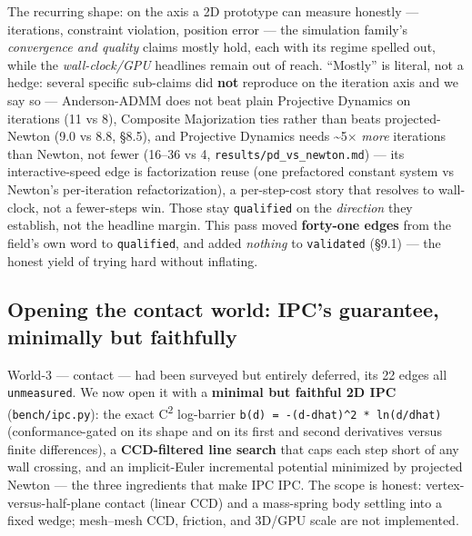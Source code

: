 \documentclass{egpubl}
\begin{document}
The recurring shape: on the axis a 2D prototype can measure honestly --- iterations, constraint
violation, position error --- the simulation family's \emph{convergence and quality} claims mostly hold, each
with its regime spelled out, while the \emph{wall-clock/GPU} headlines remain out of reach. ``Mostly'' is
literal, not a hedge: several specific sub-claims did \textbf{not} reproduce on the iteration axis and we
say so --- Anderson-ADMM does not beat plain Projective Dynamics on iterations (11 vs 8), Composite
Majorization ties rather than beats projected-Newton (9.0 vs 8.8, \S8.5), and Projective Dynamics needs
\textasciitilde{}5$\times$ \emph{more} iterations than Newton, not fewer (16--36 vs 4, \texttt{results/pd\_vs\_newton.md}) --- its
interactive-speed edge is factorization reuse (one prefactored constant system vs Newton's
per-iteration refactorization), a per-step-cost story that resolves to wall-clock, not a fewer-steps win. Those stay \texttt{qualified} on the
\emph{direction} they establish, not the headline margin. This pass moved
\textbf{forty-one edges} from the field's own word to \texttt{qualified}, and added \emph{nothing} to \texttt{validated}
(\S9.1) --- the honest yield of trying hard without inflating.

\subsection{Opening the contact world: IPC's guarantee, minimally but faithfully}

World-3 --- contact --- had been surveyed but entirely deferred, its 22 edges all \texttt{unmeasured}. We now
open it with a \textbf{minimal but faithful 2D IPC} (\texttt{bench/ipc.py}): the exact C\textsuperscript{2} log-barrier
\texttt{b(d) = -(d-dhat)\textasciicircum{}2 * ln(d/dhat)} (conformance-gated on its shape and on its first and second
derivatives versus finite differences), a
\textbf{CCD-filtered line search} that caps each step short of any wall crossing, and an implicit-Euler
incremental potential minimized by projected Newton --- the three ingredients that make IPC IPC. The
scope is honest: vertex-versus-half-plane contact (linear CCD) and a mass-spring body settling into a
fixed wedge; mesh--mesh CCD, friction, and 3D/GPU scale are not implemented.
\end{document}
